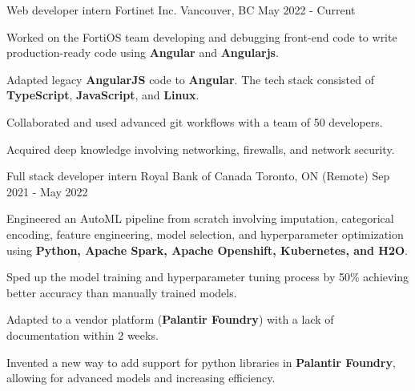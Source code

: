 

\begin{cventries}

	\cventry
	{Web developer intern} %
	{Fortinet Inc.} %
	{Vancouver, BC} %
	{May 2022 - Current} %
	{
		\begin{cvitems} %
			\item {Worked on the FortiOS team developing and debugging front-end code to write production-ready code using \textbf{Angular} and \textbf{Angularjs}.}
			\item {Adapted legacy \textbf{AngularJS} code to \textbf{Angular}. The tech stack consisted of \textbf{TypeScript}, \textbf{JavaScript}, and \textbf{Linux}.}
			\item {Collaborated and used advanced git workflows with a team of 50 developers.}
			\item {Acquired deep knowledge involving networking, firewalls, and network security.}
		\end{cvitems}
	}

	\cventry
	{Full stack developer intern} %
	{Royal Bank of Canada} %
	{Toronto, ON (Remote)} %
	{Sep 2021 - May 2022} %
	{
		\begin{cvitems} %
			\item {Engineered an AutoML pipeline from scratch involving imputation, categorical encoding, feature engineering, model selection, and hyperparameter optimization using \textbf{Python, Apache Spark, Apache Openshift, Kubernetes, and H2O}.}
			\item {Sped up the model training and hyperparameter tuning process by 50\% achieving better accuracy than manually trained models.}
			\item {Adapted to a vendor platform (\textbf{Palantir Foundry}) with a lack of documentation within 2 weeks.}
			\item {Invented a new way to add support for python libraries in \textbf{Palantir Foundry}, allowing for advanced models and increasing efficiency.}
		\end{cvitems}
	}


\end{cventries}

